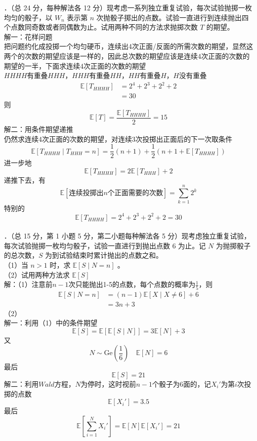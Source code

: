 \documentclass[UTF8,openany]{book}
\begin{document}
．（总 24 分，每种解法各 12 分）现考虑一系列独立重复试验，每次试验抛掷一枚均匀的骰子，以 $W_{n}$ 表示第 $n$ 次抛骰子掷出的点数。试验一直进行到连续抛出四个点数同奇数或者同偶数为止。试用两种不同的方法求抛掷次数 $T$ 的期望。\\
解一：花样问题\\
把问题约化成投掷一个均匀硬币，连续出4次正面/反面的所需次数的期望，显然这两个的次数的期望应该是一样的，因此总次数的期望应该是连续4次正面的次数的期望的一半，下面求连续4次正面的次数的期望\\
$HHHH$有重叠$HHH$，$HHH$有重叠$HH$，$HH$有重叠$H$，$H$没有重叠
\begin{align*}
	\mathbb{E}[T_{HHHH}] & =2^4+2^3+2^2+2 \\
	&=30
\end{align*}
则
\[
\mathbb{E}[T]=\frac{\mathbb{E}[T_{HHHH}]}{2}=15
\]
解二：用条件期望递推\\
仍然求连续4次正面的次数的期望，对连续3次投掷出正面后的下一次取条件
\[
\mathbb{E}[T_{HHHH}\mid T_{HHH}=n] = \frac{1}{2}(n+1)+\frac{1}{2}\left(n+1+\mathbb{E}[T_{HHHH}] \right)
\]  
进一步地
\[
\mathbb{E}[T_{HHHH}]=2\mathbb{E}\left[T_{HHH} \right]+2 
\]
递推下去，有
\[
\mathbb{E}[\text{连续投掷出}n\text{个正面需要的次数}]=\sum_{k=1}^n 2^k
\]
特别的
\[
\mathbb{E}[T_{HHHH}]=2^4+2^3+2^2+2=30
\]\\



．（总 15 分，第 1 小题 5 分，第二小题每种解法各 5 分）现考虑独立重复试验，每次试验抛掷一枚均匀骰子，试验一直进行到抛出点数 6 为止。记 $N$ 为抛掷骰子的总次数，$S$ 为到试验结束时累计抛出的点数之和。\\
（1）当 $n>1$ 时，求 $\mathbb{E}[S \mid N=n]$ 。\\
（2）试用两种方法求 $\mathbb{E}[S]$\\ 
解：（1）注意前$n-1$次只能抛出1-5的点数，每个点数的概率为$\frac{1}{5}$，则
\begin{align*}
	\mathbb{E}[S \mid N=n] &= (n-1)\mathbb{E}[X\mid X\ne 6]+6 \\
	& =3n+3
\end{align*}
（2）\\
解一：利用（1）中的条件期望
\[
\mathbb{E}[S]=\mathbb{E}[\mathbb{E}[S\mid N]]=3\mathbb{E}[N]+3
\]
又
\[
N \sim \mathrm{Ge}\left(\frac{1}{6} \right) \quad \mathbb{E}[N]=6 
\]
最后
\[
\mathbb{E}[S]=21
\]
解二：利用$Wald$方程，$N$为停时，这时视前$n-1$个骰子为6面的，记$X_i'$为第$i$次投掷的点数
\[
\mathbb{E}[X_i']=3.5
\]
最后
\[
\mathbb{E}\left[\sum_{i=1}^N X_i' \right]=\mathbb{E}[N] \mathbb{E}[X_i']=21
\]
\newpage
\end{document}
